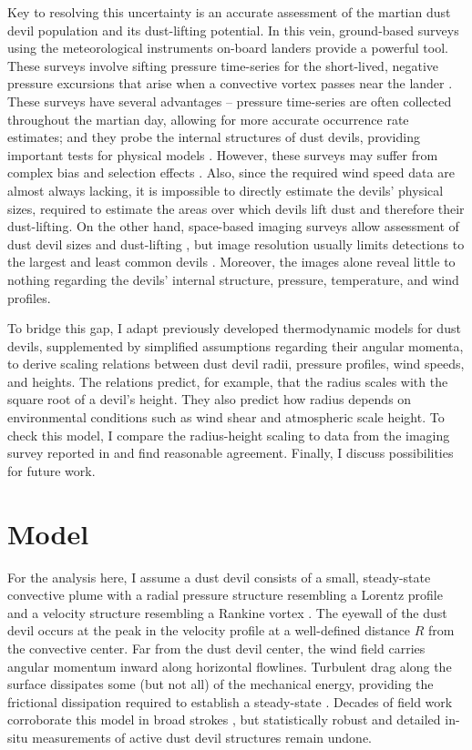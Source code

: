 \documentclass{aastex63}
\begin{document}
Key to resolving this uncertainty is an accurate assessment of the martian dust devil population and its dust-lifting potential. In this vein, ground-based surveys using the meteorological instruments on-board landers provide a powerful tool. These surveys involve sifting pressure time-series for the short-lived, negative pressure excursions that arise when a convective vortex passes near the lander \citep[e.g.][]{Ellehoj_2010, 2018Icar..299..308O}. These surveys have several advantages -- pressure time-series are often collected throughout the martian day, allowing for more accurate occurrence rate estimates; and they probe the internal structures of dust devils, providing important tests for physical models \citep{2000JGR...105.1859R}. However, these surveys may suffer from complex bias and selection effects \citep{2018Icar..299..166J}. Also, since the required wind speed data are almost always lacking, it is impossible to directly estimate the devils' physical sizes, required to estimate the areas over which devils lift dust and therefore their dust-lifting. On the other hand, space-based imaging surveys allow assessment of dust devil sizes and dust-lifting \citep{2006JGRE..11112002C}, but image resolution usually limits detections to the largest and least common devils \citep{2009Icar..203..683L}. Moreover, the images alone reveal little to nothing regarding the devils' internal structure, pressure, temperature, and wind profiles.

To bridge this gap, I adapt previously developed thermodynamic models for dust devils, supplemented by simplified assumptions regarding their angular momenta, to derive scaling relations between dust devil radii, pressure profiles, wind speeds, and heights. The relations predict, for example, that the radius scales with the square root of a devil's height. They also predict how radius depends on environmental conditions such as wind shear and atmospheric scale height. To check this model, I compare the radius-height scaling to data from the imaging survey reported in \citet{2008Icar..197...39S} and find reasonable agreement. Finally, I discuss possibilities for future work.

\section{Model} \label{sec:model}
For the analysis here, I assume a dust devil consists of a small, steady-state convective plume with a radial pressure structure resembling a Lorentz profile and a velocity structure resembling a Rankine vortex \citep{2016SSRv..203..209K}. The eyewall of the dust devil occurs at the peak in the velocity profile at a well-defined distance $R$ from the convective center. Far from the dust devil center, the wind field carries angular momentum inward along horizontal flowlines. Turbulent drag along the surface dissipates some (but not all) of the mechanical energy, providing the frictional dissipation required to establish a steady-state \citep{1998JAtS...55.3244R}. Decades of field work corroborate this model in broad strokes \citep[e.g.][]{2016SSRv..203...39M}, but statistically robust and detailed in-situ measurements of active dust devil structures remain undone.
\end{document}
